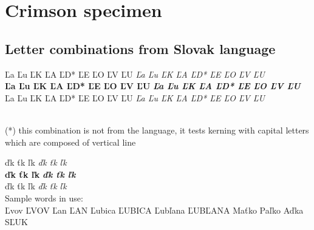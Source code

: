 ﻿\documentclass[12pt,a4paper,twoside]{article}
\begin{document}
\section{Crimson specimen}
\subsection{Letter combinations from Slovak language}
\begin{slovak}
\noindent Ľa Ľu ĽK ĽA ĽD* ĽE ĽO ĽV ĽU \textit{Ľa Ľu ĽK ĽA ĽD* ĽE ĽO ĽV ĽU}\\
\textbf{Ľa Ľu ĽK ĽA ĽD* ĽE ĽO ĽV ĽU} \textit{\textbf{Ľa Ľu ĽK ĽA ĽD* ĽE ĽO ĽV ĽU}}\\
{\crimsonbold Ľa Ľu ĽK ĽA ĽD* ĽE ĽO ĽV ĽU} {\crimsonbold\textit{Ľa Ľu ĽK ĽA ĽD* ĽE ĽO ĽV ĽU}}\end{slovak}\\
(*) this combination is not from the language, it tests kerning with capital letters which are composed of vertical line\\
\begin{slovak}
\noindent ďk ťk ľk \textit{ďk ťk ľk}\\
\textbf{ďk ťk ľk} \textit{\textbf{ďk ťk ľk}}\\
{\crimsonbold ďk ťk ľk} {\crimsonbold\textit{ďk ťk ľk}}
\medskip\\
Sample words in use:\\
Ľvov ĽVOV Ľan ĽAN Ľubica ĽUBICA Ľubľana ĽUBĽANA Maťko Paľko Aďka SĽUK
\end{slovak}
\end{document}
